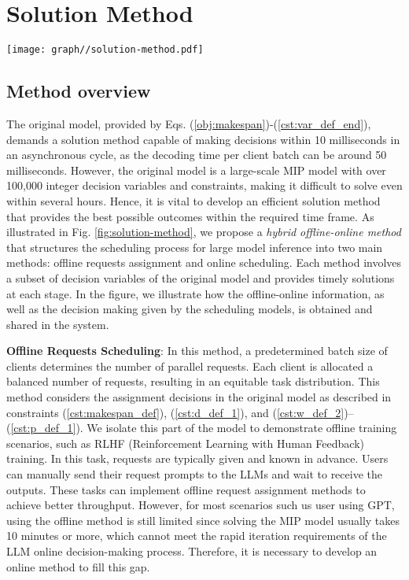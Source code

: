\section{Solution Method}
\label{solution_method}

\begin{figure*}
    \centering
    \texttt{[image: graph//solution-method.pdf]}
    \caption{Illustration of Solution Method}
    \label{fig:solution-method}
\end{figure*}

\subsection{Method overview}
The original model, provided by Eqs. (\ref{obj:makespan})-(\ref{cst:var_def_end}), demands a solution method capable of making decisions within 10 milliseconds in an asynchronous cycle, as the decoding time per client batch can be around 50 milliseconds. However, the original model is a large-scale MIP model with over 100,000 integer decision variables and constraints, making it difficult to solve even within several hours. Hence, it is vital to develop an efficient solution method that provides the best possible outcomes within the required time frame. As illustrated in Fig. \ref{fig:solution-method}, we propose a \textit{hybrid offline-online method} that structures the scheduling process for large model inference into two main methods: offline requests assignment and online scheduling. Each  method involves a subset of decision variables of the original model and provides timely solutions at each stage. In the figure, we illustrate how the offline-online information, as well as the decision making given by the scheduling models, is obtained and shared in the system.

\textbf{Offline Requests Scheduling}: In this method, a predetermined batch size of clients determines the number of parallel requests. Each client is allocated a balanced number of requests, resulting in an equitable task distribution. This method considers the assignment decisions in the original model as described in constraints (\ref{cst:makespan_def}), (\ref{cst:d_def_1}), and (\ref{cst:w_def_2})--(\ref{cst:p_def_1}). We isolate this part of the model to demonstrate offline training scenarios, such as RLHF (Reinforcement Learning with Human Feedback) training. In this task, requests are typically given and known in advance. Users can manually send their request prompts to the LLMs and wait to receive the outputs. These tasks can implement offline request assignment methods to achieve better throughput. However, for most scenarios such us user using GPT, using the offline method is still limited since solving the MIP model usually takes 10 minutes or more, which cannot meet the rapid iteration requirements of the LLM online decision-making process. Therefore, it is necessary to develop an online method to fill this gap.

